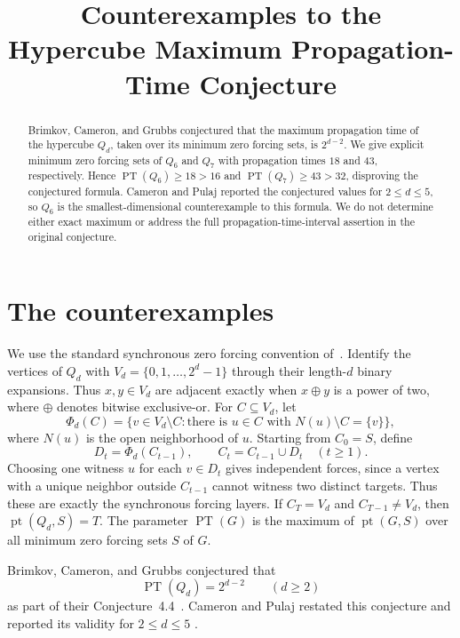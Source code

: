 \documentclass[11pt]{amsart}
\title{Counterexamples to the Hypercube Maximum Propagation-Time Conjecture}
\date{}
\theoremstyle{remark}
\DeclareMathOperator{\pt}{pt}
\DeclareMathOperator{\PT}{PT}
\begin{document}
\begin{abstract}
Brimkov, Cameron, and Grubbs conjectured that the maximum propagation
time of the hypercube $Q_d$, taken over its minimum zero forcing sets,
is $2^{d-2}$. We give explicit minimum zero forcing sets of $Q_6$ and
$Q_7$ with propagation times $18$ and $43$, respectively. Hence
$\PT(Q_6)\ge 18>16$ and $\PT(Q_7)\ge 43>32$, disproving the conjectured
formula. Cameron and Pulaj reported the conjectured values for
$2\le d\le5$, so $Q_6$ is the smallest-dimensional counterexample to
this formula. We do not determine either exact maximum or address the
full propagation-time-interval assertion in the original conjecture.
\end{abstract}

\maketitle

\section{The counterexamples}

We use the standard synchronous zero forcing convention
of~\cite{HHKMWY}. Identify the vertices of $Q_d$ with
$V_d=\{0,1,\ldots,2^d-1\}$ through their length-$d$ binary expansions.
Thus $x,y\in V_d$ are adjacent exactly when $x\mathbin{\oplus}y$ is a
power of two, where $\oplus$ denotes bitwise exclusive-or. For
$C\subseteq V_d$, let
\[
\Phi_d(C)=
\bigl\{v\in V_d\setminus C:
  \text{there is }u\in C\text{ with }N(u)\setminus C=\{v\}\bigr\},
\]
where $N(u)$ is the open neighborhood of $u$. Starting from $C_0=S$,
define
\[
D_t=\Phi_d(C_{t-1}),
\qquad
C_t=C_{t-1}\cup D_t
\quad(t\ge1).
\]
Choosing one witness $u$ for each $v\in D_t$ gives independent forces,
since a vertex with a unique neighbor outside $C_{t-1}$ cannot witness
two distinct targets. Thus these are exactly the synchronous forcing
layers. If $C_T=V_d$ and $C_{T-1}\ne V_d$, then
$\pt(Q_d,S)=T$. The parameter $\PT(G)$ is the maximum of $\pt(G,S)$
over all minimum zero forcing sets $S$ of $G$.

Brimkov, Cameron, and Grubbs conjectured that
\[
\PT(Q_d)=2^{d-2}\qquad(d\ge2)
\]
as part of their Conjecture~4.4~\cite{BCG}. Cameron and Pulaj restated
this conjecture and reported its validity for $2\le d\le5$
\cite[Conjecture~2.1 and Table~7]{CP}.
\end{document}
